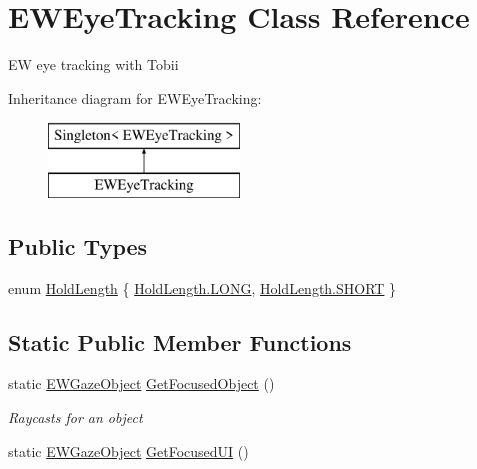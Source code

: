 \hypertarget{class_e_w_eye_tracking}{}\section{E\+W\+Eye\+Tracking Class Reference}
\label{class_e_w_eye_tracking}


EW eye tracking with Tobii  


Inheritance diagram for E\+W\+Eye\+Tracking\+:\begin{figure}[H]
\begin{center}
\leavevmode
\includegraphics[height=2.000000cm]{class_e_w_eye_tracking}
\end{center}
\end{figure}
\subsection*{Public Types}
\begin{DoxyCompactItemize}
\item 
enum \mbox{\hyperlink{class_e_w_eye_tracking_a47461bd1b91c6aacca31b57253249392}{Hold\+Length}} \{ \mbox{\hyperlink{class_e_w_eye_tracking_a47461bd1b91c6aacca31b57253249392ac1fabfea54ec6011e694f211f3ffebf3}{Hold\+Length.\+L\+O\+NG}}, 
\mbox{\hyperlink{class_e_w_eye_tracking_a47461bd1b91c6aacca31b57253249392aa35c2b02966b1563e5bf7b81b8b0cf77}{Hold\+Length.\+S\+H\+O\+RT}}
 \}
\end{DoxyCompactItemize}
\subsection*{Static Public Member Functions}
\begin{DoxyCompactItemize}
\item 
static \mbox{\hyperlink{class_e_w_gaze_object}{E\+W\+Gaze\+Object}} \mbox{\hyperlink{class_e_w_eye_tracking_a54ec9aa86d22af3b318ea940bc3c01cb}{Get\+Focused\+Object}} ()
\begin{DoxyCompactList}\small\item\em Raycasts for an object \end{DoxyCompactList}\item 
static \mbox{\hyperlink{class_e_w_gaze_object}{E\+W\+Gaze\+Object}} \mbox{\hyperlink{class_e_w_eye_tracking_a9771685d37751b6af20d1bfe5ca3dff3}{Get\+Focused\+UI}} ()
\end{DoxyCompactItemize}
